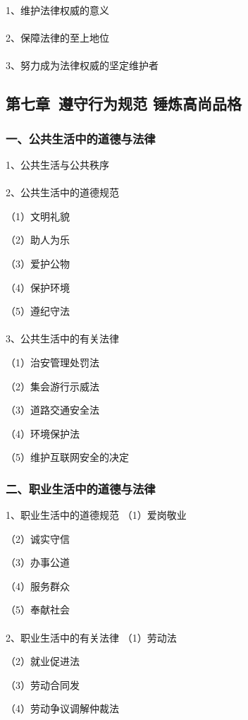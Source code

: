 \documentclass{ctexart}
\begin{document}
1、维护法律权威的意义
\\\\

2、保障法律的至上地位
\\\\

3、努力成为法律权威的坚定维护者

\subsection{第七章\ 遵守行为规范 锤炼高尚品格} 

\subsubsection{一、公共生活中的道德与法律}
1、公共生活与公共秩序
\\\\

2、公共生活中的道德规范

（1）文明礼貌

（2）助人为乐

（3）爱护公物

（4）保护环境

（5）遵纪守法
\\\\

3、公共生活中的有关法律

（1）治安管理处罚法

（2）集会游行示威法

（3）道路交通安全法

（4）环境保护法

（5）维护互联网安全的决定


\subsubsection{二、职业生活中的道德与法律}
1、职业生活中的道德规范
（1）爱岗敬业

（2）诚实守信

（3）办事公道

（4）服务群众

（5）奉献社会
\\\\

2、职业生活中的有关法律
（1）劳动法

（2）就业促进法

（3）劳动合同发

（4）劳动争议调解仲裁法
\\\\
\end{document}
